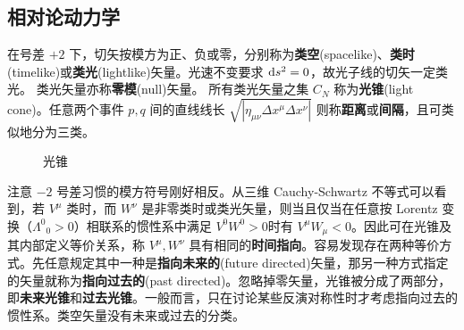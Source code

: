 \subsection{相对论动力学}

在号差 $+2$ 下，切矢按模方为正、负或零，分别称为\textbf{类空}(spacelike)、\textbf{类时}(timelike)或\textbf{类光}(lightlike)矢量。光速不变要求 $\dd s^2=0$，故光子线的切矢一定类光。
类光矢量亦称\textbf{零模}(null)矢量。
所有类光矢量之集 $C_N$ 称为\textbf{光锥}(light cone)。任意两个事件 $p,q$ 间的直线线长 $\sqrt{|\eta_{\mu\nu}\Delta x^\mu\Delta x^\nu|}$ 则称\textbf{距离}或\textbf{间隔}，且可类似地分为三类。
\begin{figure}[ht]
    \centering
    \quad
    \caption{光锥}
\end{figure}
注意 $-2$ 号差习惯的模方符号刚好相反。从三维 Cauchy-Schwartz 不等式可以看到，若 $V^\mu$ 类时，而 $W^\nu$ 是非零类时或类光矢量，则当且仅当在任意按 Lorentz 变换（${\Lambda^{0}}_{0} >0$）相联系的惯性系中满足 $V^{0} W^{0}>0$时有 $V^\mu W_\mu<0$。因此可在光锥及其内部定义等价关系，称 $V^\mu,W^\nu$ 具有相同的\textbf{时间指向}。容易发现存在两种等价方式。先任意规定其中一种是\textbf{指向未来的}(future directed)矢量，那另一种方式指定的矢量就称为\textbf{指向过去的}(past directed)。忽略掉零矢量，光锥被分成了两部分，即\textbf{未来光锥}和\textbf{过去光锥}。一般而言，只在讨论某些反演对称性时才考虑指向过去的惯性系。类空矢量没有未来或过去的分类。


